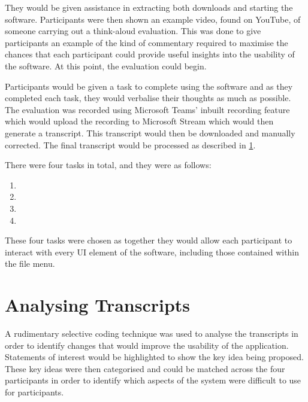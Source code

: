 \documentclass{l4proj}
\begin{document}
They would be given assistance in extracting both downloads and starting the software. Participants were then shown an example video, found on YouTube, of someone carrying out a think-aloud evaluation. This was done to give participants an example of the kind of commentary required to maximise the chances that each participant could provide useful insights into the usability of the software. At this point, the evaluation could begin.

Participants would be given a task to complete using the software and as they completed each task, they would verbalise their thoughts as much as possible. The evaluation was recorded using Microsoft Teams' inbuilt recording feature which would upload the recording to Microsoft Stream which would then generate a transcript. This transcript would then be downloaded and manually corrected. The final transcript would be processed as described in \ref{analysing-transcripts}.

There were four tasks in total, and they were as follows:
\begin{enumerate}
    \item {}
    \item {}
    \item {}
    \item {}
\end{enumerate}
These four tasks were chosen as together they would allow each participant to interact with every UI element of the software, including those contained within the file menu.

\section{Analysing Transcripts} \label{analysing-transcripts}
A rudimentary selective coding technique was used to analyse the transcripts in order to identify changes that would improve the usability of the application. Statements of interest would be highlighted to show the key idea being proposed. These key ideas were then categorised and could be matched across the four participants in order to identify which aspects of the system were difficult to use for participants. 
\end{document}

